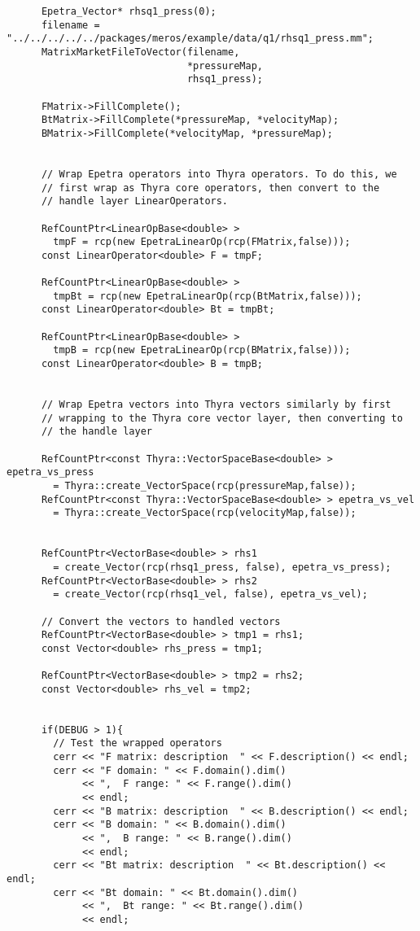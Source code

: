 \begin{verbatim}
      Epetra_Vector* rhsq1_press(0);
      filename = "../../../../../packages/meros/example/data/q1/rhsq1_press.mm";
      MatrixMarketFileToVector(filename,
                               *pressureMap, 
                               rhsq1_press);

      FMatrix->FillComplete();
      BtMatrix->FillComplete(*pressureMap, *velocityMap);
      BMatrix->FillComplete(*velocityMap, *pressureMap);


      // Wrap Epetra operators into Thyra operators. To do this, we
      // first wrap as Thyra core operators, then convert to the
      // handle layer LinearOperators.
      
      RefCountPtr<LinearOpBase<double> >
        tmpF = rcp(new EpetraLinearOp(rcp(FMatrix,false)));
      const LinearOperator<double> F = tmpF;

      RefCountPtr<LinearOpBase<double> >
        tmpBt = rcp(new EpetraLinearOp(rcp(BtMatrix,false)));
      const LinearOperator<double> Bt = tmpBt;

      RefCountPtr<LinearOpBase<double> >
        tmpB = rcp(new EpetraLinearOp(rcp(BMatrix,false)));
      const LinearOperator<double> B = tmpB;


      // Wrap Epetra vectors into Thyra vectors similarly by first
      // wrapping to the Thyra core vector layer, then converting to
      // the handle layer

      RefCountPtr<const Thyra::VectorSpaceBase<double> > epetra_vs_press
        = Thyra::create_VectorSpace(rcp(pressureMap,false));
      RefCountPtr<const Thyra::VectorSpaceBase<double> > epetra_vs_vel
        = Thyra::create_VectorSpace(rcp(velocityMap,false));


      RefCountPtr<VectorBase<double> > rhs1
        = create_Vector(rcp(rhsq1_press, false), epetra_vs_press);
      RefCountPtr<VectorBase<double> > rhs2
        = create_Vector(rcp(rhsq1_vel, false), epetra_vs_vel);

      // Convert the vectors to handled vectors
      RefCountPtr<VectorBase<double> > tmp1 = rhs1;
      const Vector<double> rhs_press = tmp1;

      RefCountPtr<VectorBase<double> > tmp2 = rhs2;
      const Vector<double> rhs_vel = tmp2;


      if(DEBUG > 1){
        // Test the wrapped operators
        cerr << "F matrix: description  " << F.description() << endl;
        cerr << "F domain: " << F.domain().dim() 
             << ",  F range: " << F.range().dim() 
             << endl;
        cerr << "B matrix: description  " << B.description() << endl;
        cerr << "B domain: " << B.domain().dim() 
             << ",  B range: " << B.range().dim() 
             << endl;
        cerr << "Bt matrix: description  " << Bt.description() << endl;
        cerr << "Bt domain: " << Bt.domain().dim() 
             << ",  Bt range: " << Bt.range().dim() 
             << endl;


\end{verbatim}
